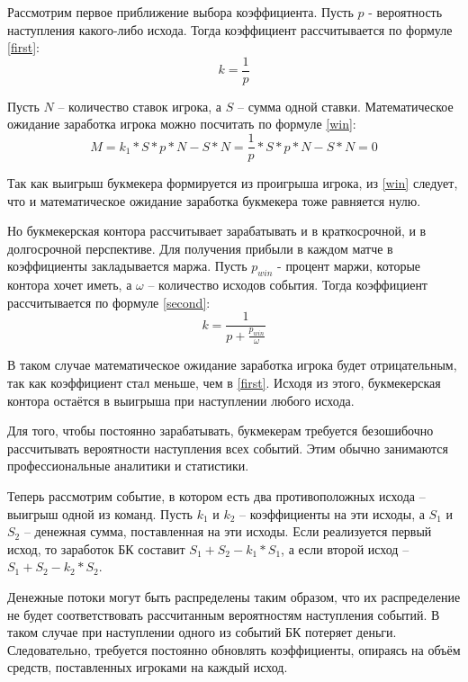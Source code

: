 Рассмотрим первое приближение выбора коэффициента. Пусть $p$ - вероятность наступления какого-либо исхода. Тогда коэффициент рассчитывается по формуле \ref{first}: 
\begin{equation}\label{first}
k = \frac{1}{p}
\end{equation}

Пусть $N$ -- количество ставок игрока, а $S$ -- сумма одной ставки. Математическое ожидание заработка игрока можно посчитать по формуле \ref{win}:
\begin{equation}\label{win} 
M = k_1 * S * p * N - S * N = \frac{1}{p} * S * p * N - S * N = 0
\end{equation}

Так как выигрыш букмекера формируется из проигрыша игрока, из \ref{win} следует, что и математическое ожидание заработка букмекера тоже равняется нулю.

Но букмекерская контора рассчитывает зарабатывать и в краткосрочной, и в долгосрочной перспективе. Для получения прибыли в каждом матче в коэффициенты закладывается маржа. Пусть $p_{win}$ - процент маржи, которые контора хочет иметь, а $\omega$ -- количество исходов события. Тогда коэффициент рассчитывается по формуле \ref{second}:
\begin{equation}\label{second}
k = \frac{1}{p + \frac{p_{win}}{\omega}}
\end{equation}

В таком случае математическое ожидание заработка игрока будет отрицательным, так как коэффициент стал меньше, чем в \ref{first}. Исходя из этого, букмекерская контора остаётся в выигрыша при наступлении любого исхода.

Для того, чтобы постоянно зарабатывать, букмекерам требуется безошибочно рассчитывать вероятности наступления всех событий. 
Этим обычно занимаются профессиональные аналитики и статистики.

Теперь рассмотрим событие, в котором есть два противоположных исхода -- выигрыш одной из команд. Пусть $k_1$ и $k_2$ -- коэффициенты на эти исходы, а $S_1$ и $S_2$ -- денежная сумма, поставленная на эти исходы. 
Если реализуется первый исход, то заработок БК составит $S_1 + S_2 - k_1 * S_1$, а если второй исход -- 
$S_1 + S_2 - k_2 * S_2$. 

Денежные потоки могут быть распределены таким образом, что их распределение не будет соответствовать рассчитанным вероятностям наступления событий. 
В таком случае при наступлении одного из событий БК потеряет деньги.
Следовательно, требуется постоянно обновлять коэффициенты, опираясь на объём средств, поставленных игроками на каждый исход.

